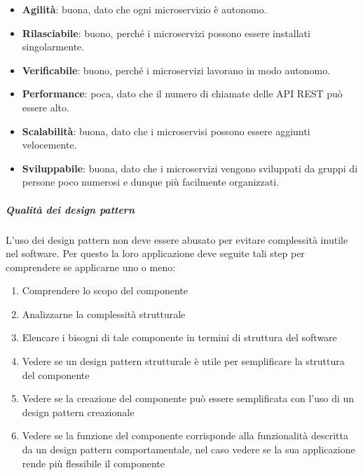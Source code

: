 \begin{itemize}
                \begin{itemize}
                    \item \textbf{Agilità}: buona, dato che ogni microservizio è autonomo.
                    \item \textbf{Rilasciabile}: buono, perché i microservizi possono essere installati singolarmente.
                    \item \textbf{Verificabile}: buono, perché i microservizi lavorano in modo autonomo.
                    \item \textbf{Performance}: poca, dato che il numero di chiamate delle API REST può essere alto.
                    \item \textbf{Scalabilità}: buona, dato che i microservisi possono essere aggiunti velocemente.
                    \item \textbf{Sviluppabile}: buona, dato che i microservizi vengono sviluppati da gruppi di persone poco numerosi e dunque più facilmente organizzati.
                \end{itemize}
        \end{itemize}

        \subparagraph{Qualità dei design pattern} \label{PP:progettazione:designPattern}
        L'uso dei design pattern non deve essere abusato per evitare complessità inutile nel software. Per questo la loro applicazione deve seguite tali step per comprendere se applicarne uno o meno:
        \begin{enumerate}
            \item Comprendere lo scopo del componente
            \item Analizzarne la complessità strutturale
            \item Elencare i bisogni di tale componente in termini di struttura del software
            \item Vedere se un design pattern strutturale è utile per semplificare la struttura del componente
            \item Vedere se la creazione del componente può essere semplificata con l'uso di un design pattern creazionale
            \item Vedere se la funzione del componente corrisponde alla funzionalità descritta da un design pattern comportamentale, nel caso vedere se la sua applicazione rende più flessibile il componente
        \end{enumerate}
        
